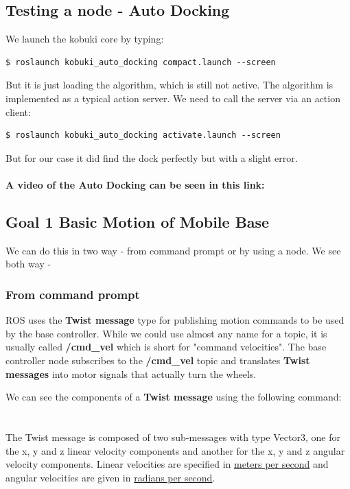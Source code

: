\documentclass[10pt,a4paper]{article}
\begin{document}
\subsection{Testing a node - Auto Docking}
We launch the kobuki core by typing:

\begin{lstlisting}[frame=single] 
$ roslaunch kobuki_auto_docking compact.launch --screen
\end{lstlisting}
But it is just loading the algorithm, which is still not active. The algorithm is implemented as a typical action server. We need to call the server via an action client:

\begin{lstlisting}[frame=single] 
$ roslaunch kobuki_auto_docking activate.launch --screen
\end{lstlisting}

But for our case it did find the dock perfectly but with a slight error.
\\\\
\textbf{A video of the Auto Docking can be seen in this link:}\\ 


\subsection{Goal 1 Basic Motion of Mobile Base}

We can do this in two way - from command prompt or by using a node. We see both way - 
\subsubsection{From command prompt}
ROS uses the \textbf{Twist message} type for publishing motion commands to be used by the base controller. While we could use almost any name for a topic, it is usually called \textbf{/cmd\_vel} which is short for "command velocities". The base controller node subscribes to the \textbf{/cmd\_vel} topic and translates \textbf{Twist messages} into motor signals that actually turn the wheels.

We can see the components of a \textbf{Twist message} using the following command:\\\\
\\

The Twist message is composed of two sub-messages with type Vector3, one for the x, y and z linear velocity components and another for the x, y and z angular velocity components. Linear velocities are specified in \underline{meters per second} and angular velocities are given in \underline{radians per second}.\\
\end{document}

